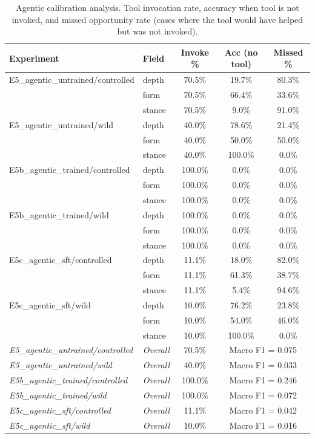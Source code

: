 \begin{table}[t]
\centering
\caption{Agentic calibration analysis. Tool invocation rate, accuracy when tool is not invoked, and missed opportunity rate (cases where the tool would have helped but was not invoked).}
\label{tab:calibration}
\small
\begin{tabular}{llccc}
\toprule
Experiment & Field & Invoke \% & Acc (no tool) & Missed \% \\
\midrule
E5\_agentic\_untrained/controlled & depth & 70.5\% & 19.7\% & 80.3\% \\
 & form & 70.5\% & 66.4\% & 33.6\% \\
 & stance & 70.5\% & 9.0\% & 91.0\% \\
\midrule
E5\_agentic\_untrained/wild & depth & 40.0\% & 78.6\% & 21.4\% \\
 & form & 40.0\% & 50.0\% & 50.0\% \\
 & stance & 40.0\% & 100.0\% & 0.0\% \\
\midrule
E5b\_agentic\_trained/controlled & depth & 100.0\% & 0.0\% & 0.0\% \\
 & form & 100.0\% & 0.0\% & 0.0\% \\
 & stance & 100.0\% & 0.0\% & 0.0\% \\
\midrule
E5b\_agentic\_trained/wild & depth & 100.0\% & 0.0\% & 0.0\% \\
 & form & 100.0\% & 0.0\% & 0.0\% \\
 & stance & 100.0\% & 0.0\% & 0.0\% \\
\midrule
E5c\_agentic\_sft/controlled & depth & 11.1\% & 18.0\% & 82.0\% \\
 & form & 11.1\% & 61.3\% & 38.7\% \\
 & stance & 11.1\% & 5.4\% & 94.6\% \\
\midrule
E5c\_agentic\_sft/wild & depth & 10.0\% & 76.2\% & 23.8\% \\
 & form & 10.0\% & 54.0\% & 46.0\% \\
 & stance & 10.0\% & 100.0\% & 0.0\% \\
\midrule
\midrule
\textit{E5\_agentic\_untrained/controlled} & \textit{Overall} & 70.5\% & \multicolumn{2}{c}{Macro F1 = 0.075} \\
\textit{E5\_agentic\_untrained/wild} & \textit{Overall} & 40.0\% & \multicolumn{2}{c}{Macro F1 = 0.033} \\
\textit{E5b\_agentic\_trained/controlled} & \textit{Overall} & 100.0\% & \multicolumn{2}{c}{Macro F1 = 0.246} \\
\textit{E5b\_agentic\_trained/wild} & \textit{Overall} & 100.0\% & \multicolumn{2}{c}{Macro F1 = 0.072} \\
\textit{E5c\_agentic\_sft/controlled} & \textit{Overall} & 11.1\% & \multicolumn{2}{c}{Macro F1 = 0.042} \\
\textit{E5c\_agentic\_sft/wild} & \textit{Overall} & 10.0\% & \multicolumn{2}{c}{Macro F1 = 0.016} \\
\bottomrule
\end{tabular}
\end{table}
